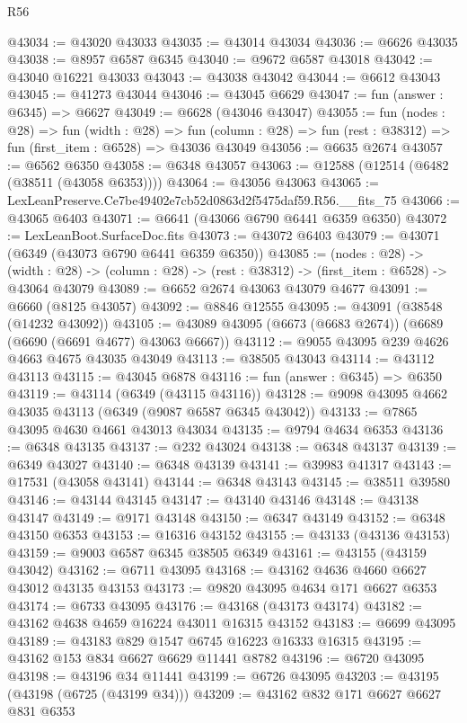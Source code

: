 \begin{lexlean}{R56}
\begin{coremodule}
@43034 := @43020 @43033
@43035 := @43014 @43034
@43036 := @6626 @43035
@43038 := @8957 @6587 @6345
@43040 := @9672 @6587 @43018
@43042 := @43040 @16221 @43033
@43043 := @43038 @43042
@43044 := @6612 @43043
@43045 := @41273 @43044
@43046 := @43045 @6629
@43047 := fun (answer : @6345) => @6627
@43049 := @6628 (@43046 @43047)
@43055 := fun (nodes : @28) =>
  fun (width : @28) =>
  fun (column : @28) => fun (rest : @38312) => fun (first_item : @6528) => @43036 @43049
@43056 := @6635 @2674
@43057 := @6562 @6350
@43058 := @6348 @43057
@43063 := @12588 (@12514 (@6482 (@38511 (@43058 @6353))))
@43064 := @43056 @43063
@43065 := LexLeanPreserve.Ce7be49402e7cb52d0863d2f5475daf59.R56.__fits_75
@43066 := @43065 @6403
@43071 := @6641 (@43066 @6790 @6441 @6359 @6350)
@43072 := LexLeanBoot.SurfaceDoc.fits
@43073 := @43072 @6403
@43079 := @43071 (@6349 (@43073 @6790 @6441 @6359 @6350))
@43085 := (nodes : @28) ->
  (width : @28) -> (column : @28) -> (rest : @38312) -> (first_item : @6528) -> @43064 @43079
@43089 := @6652 @2674 @43063 @43079 @4677
@43091 := @6660 (@8125 @43057)
@43092 := @8846 @12555
@43095 := @43091 (@38548 (@14232 @43092))
@43105 := @43089 @43095 (@6673 (@6683 @2674)) (@6689 (@6690 (@6691 @4677) @43063 @6667))
@43112 := @9055 @43095 @239 @4626 @4663 @4675 @43035 @43049
@43113 := @38505 @43043
@43114 := @43112 @43113
@43115 := @43045 @6878
@43116 := fun (answer : @6345) => @6350
@43119 := @43114 (@6349 (@43115 @43116))
@43128 := @9098 @43095 @4662 @43035 @43113 (@6349 (@9087 @6587 @6345 @43042))
@43133 := @7865 @43095 @4630 @4661 @43013 @43034
@43135 := @9794 @4634 @6353
@43136 := @6348 @43135
@43137 := @232 @43024
@43138 := @6348 @43137
@43139 := @6349 @43027
@43140 := @6348 @43139
@43141 := @39983 @41317
@43143 := @17531 (@43058 @43141)
@43144 := @6348 @43143
@43145 := @38511 @39580
@43146 := @43144 @43145
@43147 := @43140 @43146
@43148 := @43138 @43147
@43149 := @9171 @43148
@43150 := @6347 @43149
@43152 := @6348 @43150 @6353
@43153 := @16316 @43152
@43155 := @43133 (@43136 @43153)
@43159 := @9003 @6587 @6345 @38505 @6349
@43161 := @43155 (@43159 @43042)
@43162 := @6711 @43095
@43168 := @43162 @4636 @4660 @6627 @43012 @43135 @43153
@43173 := @9820 @43095 @4634 @171 @6627 @6353
@43174 := @6733 @43095
@43176 := @43168 (@43173 @43174)
@43182 := @43162 @4638 @4659 @16224 @43011 @16315 @43152
@43183 := @6699 @43095
@43189 := @43183 @829 @1547 @6745 @16223 @16333 @16315
@43195 := @43162 @153 @834 @6627 @6629 @11441 @8782
@43196 := @6720 @43095
@43198 := @43196 @34 @11441
@43199 := @6726 @43095
@43203 := @43195 (@43198 (@6725 (@43199 @34)))
@43209 := @43162 @832 @171 @6627 @6627 @831 @6353

\end{coremodule}
\end{lexlean}
